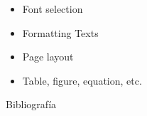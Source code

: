 \documentclass[12pt, aspectratio = 169]{beamer}
\begin{document}
        \begin{frame}[t,label = Slide 7.2]
            \begin{itemize}[<+-|alert@+>]
                \frametitle{\LaTeX\ components}
                \item Font selection
                \item Formatting Texts
                \item Page layout \hfill \hyperlink{Slide 7.1}{}
                \item Table, figure, equation, etc.
            \end{itemize}
        \end{frame}
    \begin{frame}{Bibliografía}
        
        
            \nocite{cameron-2010}
    \end{frame}
    \begin{frame}
        \maketitle
    \end{frame}
    
    
\end{document}
